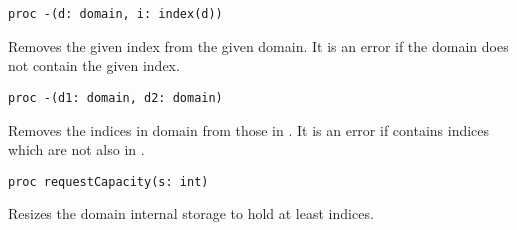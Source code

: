 \begin{protohead}
\begin{verbatim}
proc -(d: domain, i: index(d))
\end{verbatim}
\end{protohead}
\begin{protobody}
Removes the given index from the given domain.  It is an error if the domain
does not contain the given index.
\end{protobody}

\begin{protohead}
\begin{verbatim}
proc -(d1: domain, d2: domain)
\end{verbatim}
\end{protohead}
\begin{protobody}
Removes the indices in domain  from those in .  It is an error
if  contains indices which are not also in .
\end{protobody}

\begin{protohead}
\begin{verbatim}
proc requestCapacity(s: int)
\end{verbatim}
\end{protohead}
\begin{protobody}
Resizes the domain internal storage to hold at least  indices.
\end{protobody}
